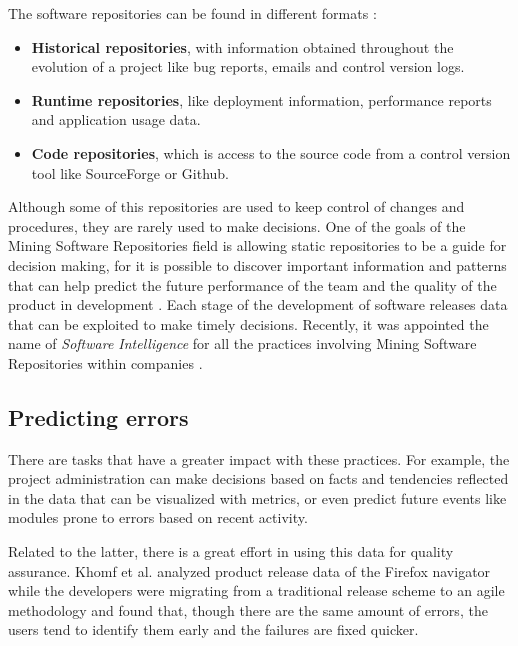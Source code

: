 The software repositories can be found in different formats \cite{H08}:
\begin{itemize}
	\item \textbf{Historical repositories}, with information obtained throughout the evolution of a project like bug reports, emails and control version logs.
	\item \textbf{Runtime repositories}, like deployment information, performance reports and application usage data.
	\item \textbf{Code repositories}, which is access to the source code from a control version tool like SourceForge or Github.
\end{itemize}

Although some of this repositories are used to keep control of changes and procedures, they are rarely used to make decisions. One of the goals of the Mining Software Repositories field is allowing static repositories to be a guide for decision making, for it is possible to discover important information and patterns that can help predict the future performance of the team and the quality of the product in development \cite{H08}. Each stage of the development of software releases data that can be exploited to make timely decisions. Recently, it was appointed the name of \emph{Software Intelligence} for all the practices involving Mining Software Repositories within companies \cite{HX10}.

\subsection{Predicting errors}
There are tasks that have a greater impact with these practices. For example, the project administration can make decisions based on facts and tendencies reflected in the data that can be visualized with metrics, or even predict future events like modules prone to errors based on recent activity.

Related to the latter, there is a great effort in using this data for quality assurance. Khomf et al. \cite{KDZ12} analyzed product release data of the Firefox navigator while the developers were migrating from a traditional release scheme to an agile methodology and found that, though there are the same amount of errors, the users tend to identify them early and the failures are fixed quicker.

